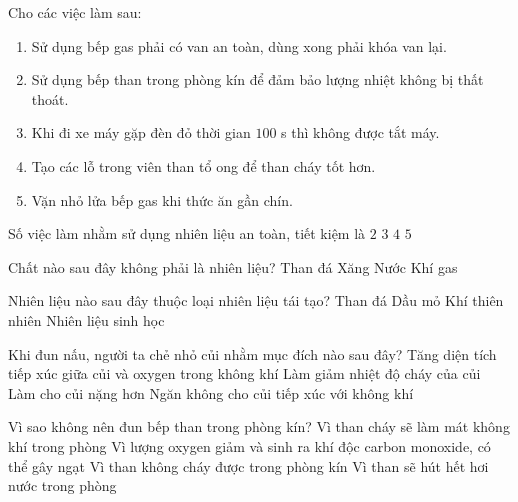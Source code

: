 \documentclass[Main.tex]{subfiles}
\begin{document}
\begin{ex}%
	Cho các việc làm sau:
	\begin{enumerate}
		\item[(a)] Sử dụng bếp gas phải có van an toàn, dùng xong phải khóa van lại.
		\item[(b)] Sử dụng bếp than trong phòng kín để đảm bảo lượng nhiệt không bị thất thoát.
		\item[(c)] Khi đi xe máy gặp đèn đỏ thời gian $100$ s thì không được tắt máy.
		\item[(d)] Tạo các lỗ trong viên than tổ ong để than cháy tốt hơn.
		\item[(e)] Vặn nhỏ lửa bếp gas khi thức ăn gần chín.
	\end{enumerate}
	Số việc làm nhằm sử dụng nhiên liệu an toàn, tiết kiệm là
	\choice
	{$2$}
	{\True $3$}
	{$4$}
	{$5$}
\end{ex}

\begin{ex}%
	Chất nào sau đây không phải là nhiên liệu?
	\choice
	{Than đá}
	{Xăng}
	{\True Nước}
	{Khí gas}
\end{ex}

\begin{ex}%
	Nhiên liệu nào sau đây thuộc loại nhiên liệu tái tạo?
	\choice
	{Than đá}
	{Dầu mỏ}
	{Khí thiên nhiên}
	{\True Nhiên liệu sinh học}
\end{ex}

\begin{ex}%
	Khi đun nấu, người ta chẻ nhỏ củi nhằm mục đích nào sau đây?
	\choice
	{\True Tăng diện tích tiếp xúc giữa củi và oxygen trong không khí}
	{Làm giảm nhiệt độ cháy của củi}
	{Làm cho củi nặng hơn}
	{Ngăn không cho củi tiếp xúc với không khí}
\end{ex}

\begin{ex}%
	Vì sao không nên đun bếp than trong phòng kín?
	\choice
	{Vì than cháy sẽ làm mát không khí trong phòng}
	{\True Vì lượng oxygen giảm và sinh ra khí độc carbon monoxide, có thể gây ngạt}
	{Vì than không cháy được trong phòng kín}
	{Vì than sẽ hút hết hơi nước trong phòng}
\end{ex}
\end{document}
